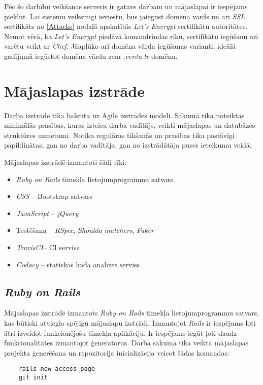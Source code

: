 Pēc šo darbību veikšanas serveris ir gatavs darbam un mājaslapai ir iespējams piekļūt. Lai sistēmu veiksmīgi ieviestu, būs jāiegūst domēna vārds un arī \textit{SSL} sertifikāts no \ref{Attacks} nodaļā apskatītās \textit{Let's Encrypt} sertifikātu autoritātes. Ņemot vērā, ka \textit{Let's Encrypt} piedāvā komandrindas rīku, sertifikātu iegūšanu arī varētu veikt ar \textit{Chef}. Jāaplūko arī domēna vārda iegūšanas varianti, ideālā gadījumā iegūstot domēna vārdu zem \textit{.venta.lv} domēna.

\section{Mājaslapas izstrāde}
Darba izstrāde tika balstīta uz Agile izstrādes modeli. Sākumā tika noteiktas minimālās prasības, kuras izteica darba vadītājs, veikti mājaslapas un datubāzes struktūres uzmetumi. Notika regulāras tikšanās un prasības tika pastāvīgi papildinātas, gan no darba vadītāja, gan no izstrādātāja puses ieteikumu veidā.

Mājaslapas izstrādē izmantoti šādi rīki:
\begin{itemize}
	\item \textit{Ruby on Rails} tīmekļa lietojumprogrammu satvars.
	\item \textit{CSS} -- Bootstrap satvars
	\item \textit{JavaScript} -- \textit{jQuery}
	\item Testēšana -- \textit{RSpec}, \textit{Shoulda matchers}, \textit{Faker}
	\item \textit{TravisCI}-- CI serviss
	\item \textit{Codacy} -- statiskas koda analīzes serviss
\end{itemize}

\subsection{\textit{Ruby on Rails}}
Mājaslapas izstrādē izmantots \textit{Ruby on Rails} tīmekļa lietojumprogrammu satvars, kas būtiski atvieglo spējīgu mājaslapu izstrādi.
Izmantojot \textit{Rails} ir iespējams loti ātri izveidot funkcionējošu tīmekļa aplikāciju. Ir iespējams iegūt ļoti daudz funkcionalitātes izmantojot ģeneratorus.
Darba sākumā tika veikta mājaslapas projekta ģenerēšana un repozitorija inicializācija veicot šādas komandas:
\begin{lstlisting}
	rails new access_page
	git init
\end{lstlisting}

